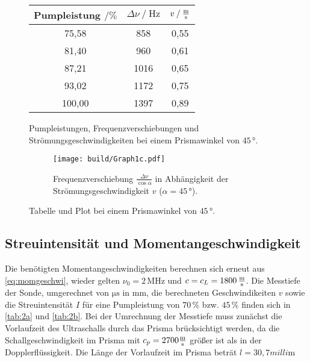 \begin{figure}
    \begin{subtable}{0.43\textwidth}
        \centering
       \begin{tabular}{c c c}
        \toprule 
        {Pumpleistung $\mathbin{/}\%$} & {$\Delta \nu \mathbin{/} \unit{\hertz}$} & {$v \mathbin{/} \unit{\frac{\meter}{\second}}$}  \\
        \midrule 
                 75,58     &     858   & 0,55 \\
                 81,40     &     960   & 0,61 \\
                 87,21     &     1016  & 0,65 \\
                 93,02     &     1172  & 0,75 \\
                100,00     &     1397  & 0,89 \\
        \bottomrule
       \end{tabular}
       \caption{Pumpleistungen, Frequenzverschiebungen und Strömungsgeschwindigkeiten bei einem Prismawinkel von $45 \,°$.}
        \label{tab:1winkel3}
    \end{subtable}
    \begin{subfigure}{0.57\textwidth} 
        \centering
        \texttt{[image: build/Graph1c.pdf]}  
        \caption{Frequenzverschiebung $\frac{\Delta \nu}{\cos\alpha}$ in Abhängigkeit der Strömungsgeschwindigkeit $v$ ($\alpha = 45 \,°$).}
        \label{fig:graph1c}
        \qquad
    \end{subfigure}
    \caption{Tabelle und Plot bei einem Prismawinkel von $45 \,°$.} 
\end{figure}    

\subsection{Streuintensität und Momentangeschwindigkeit}

Die benötigten Momentangeschwindigkeiten berechnen sich erneut aus \eqref{eq:momgeschwi}, wieder gelten $\nu_0 = 2 \,\unit{\mega\hertz}$ und $c = c_L = 1800 \,\unit{\frac{\meter}{\second}}$.
Die Messtiefe der Sonde, umgerechnet von $\unit{\micro\second}$ in $\unit{\milli\meter}$, die berechneten Geschwindikeiten $v$ sowie die Streuintensität $I$ für eine Pumpleistung von $70 \,\%$ bzw. $45 \,\%$ finden sich in \autoref{tab:2a} und \autoref{tab:2b}.
Bei der Umrechnung der Messtiefe muss zunächst die Vorlaufzeit des Ultraschalls durch das Prisma brücksichtigt werden, da die Schallgeschwindigkeit im Prisma mit $c_p = 2700 \unit{\frac{\meter}{\second}}$ größer ist als in der Dopplerflüssigkeit.
Die Länge der Vorlaufzeit im Prisma beträt $ l = 30,7 \unit{milli\meter}$

